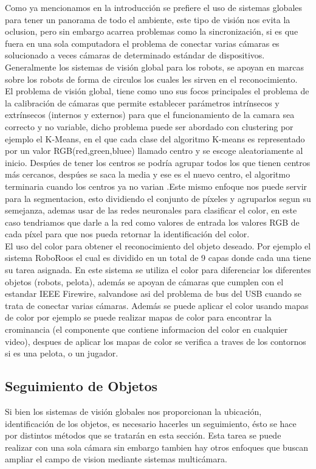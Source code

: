 \documentclass[conference]{IEEEtran}
\begin{document}
Como ya mencionamos en la introducci\'on se prefiere el uso de sistemas globales para tener un panorama de todo el ambiente, este tipo de visi\'on nos evita la oclusion, pero sin embargo acarrea problemas como la sincronizaci\'on, si es que fuera en una sola computadora el problema de conectar varias c\'amaras es solucionado a veces c\'amaras de determinado est\'andar de dispositivos. Generalmente los sistemas de visi\'on global para los robots, se apoyan en marcas sobre los robots de forma de circulos los cuales les sirven  en el reconocimiento.\\
El problema de visi\'on global, tiene como uno sus focos principales el problema de la calibraci\'on de c\'amaras que permite establecer par\'ametros intr\'insecos y extr\'insecos (internos y externos) para que el funcionamiento de la camara sea correcto y no variable, dicho problema puede ser abordado con clustering por ejemplo el K-Means, en el que cada clase del algoritmo K-means es representado por un valor RGB(red,green,bluee) llamado centro  y se escoge aleatoriamente al inicio. Desp\'ues de tener los centros se podr\'ia agrupar  todos los que tienen centros m\'as cercanos, desp\'ues se saca la media y ese es el nuevo centro, el algoritmo terminaria cuando los centros ya no varian \cite{kelson_glo}.Este mismo enfoque nos puede servir para la segmentacion, esto dividiendo el conjunto de p\'ixeles y agruparlos segun su semejanza, ademas usar  de las redes neuronales para clasificar el color, en este caso tendriamos que darle a la red como valores de entrada los valores RGB de cada p\'ixel para que nos pueda retornar la identificaci\'on del color\cite{chabra_glo}.\\
El uso del color para obtener el reconocimiento del objeto deseado. Por ejemplo el sistema RoboRoos el cual es dividido en un total de 9 capas donde cada una tiene su tarea asignada. En este sistema se utiliza el color para diferenciar los diferentes objetos (robots, pelota), adem\'as se apoyan de c\'amaras que cumplen con el estandar IEEE Firewire, salvandose asi del problema de bus del USB cuando se trata de conectar varias c\'amaras\cite{ball_glo}. Adem\'as se puede aplicar el color usando mapas de color por ejemplo se puede realizar mapas de color para encontrar la crominancia (el componente que contiene informacion del color en cualquier video), despues de aplicar los mapas de color se verifica a traves de los contornos si es una pelota, o un jugador\cite{clau_glo}.
\\


\subsection{\textbf{Seguimiento de Objetos }}
Si bien los sistemas de visi\'on globales nos proporcionan la ubicaci\'on, identificaci\'on de los objetos, es necesario hacerles un seguimiento, \'esto se hace por distintos m\'etodos que se tratar\'an en esta secci\'on. Esta tarea se puede realizar con una sola c\'amara sin embargo tambien hay otros enfoques que buscan ampliar el campo de vision mediante sistemas multic\'amara.\\
\end{document}
